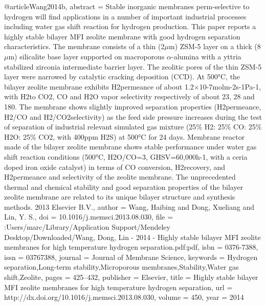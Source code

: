 @article{Wang2014b,
abstract = {Stable inorganic membranes perm-selective to hydrogen will find applications in a number of important industrial processes including water gas shift reaction for hydrogen production. This paper reports a highly stable bilayer MFI zeolite membrane with good hydrogen separation characteristics. The membrane consists of a thin (2$\mu$m) ZSM-5 layer on a thick (8$\mu$m) silicalite base layer supported on macroporous $\alpha$-alumina with a yttria stabilized zirconia intermediate barrier layer. The zeolitic pores of the thin ZSM-5 layer were narrowed by catalytic cracking deposition (CCD). At 500°C, the bilayer zeolite membrane exhibits H2permeance of about 1.2×10-7molm-2s-1Pa-1, with H2to CO2, CO and H2O vapor selectivity respectively of about 23, 28 and 180. The membrane shows slightly improved separation properties (H2permeance, H2/CO and H2/CO2selectivity) as the feed side pressure increases during the test of separation of industrial relevant simulated gas mixture (25{\%} H2: 25{\%} CO: 25{\%} H2O: 25{\%} CO2, with 400ppm H2S) at 500°C for 24 days. Membrane reactor made of the bilayer zeolite membrane shows stable performance under water gas shift reaction conditions (500°C, H2O/CO=3, GHSV=60,000h-1, with a ceria doped iron oxide catalyst) in terms of CO conversion, H2recovery, and H2permeance and selectivity of the zeolite membrane. The unprecedented thermal and chemical stability and good separation properties of the bilayer zeolite membrane are related to its unique bilayer structure and synthesis methods. {\textcopyright} 2013 Elsevier B.V.},
author = {Wang, Haibing and Dong, Xueliang and Lin, Y. S.},
doi = {10.1016/j.memsci.2013.08.030},
file = {:Users/marc/Library/Application Support/Mendeley Desktop/Downloaded/Wang, Dong, Lin - 2014 - Highly stable bilayer MFI zeolite membranes for high temperature hydrogen separation.pdf:pdf},
isbn = {0376-7388},
issn = {03767388},
journal = {Journal of Membrane Science},
keywords = {Hydrogen separation,Long-term stability,Microporous membranes,Stability,Water gas shift,Zeolite},
pages = {425--432},
publisher = {Elsevier},
title = {{Highly stable bilayer MFI zeolite membranes for high temperature hydrogen separation}},
url = {http://dx.doi.org/10.1016/j.memsci.2013.08.030},
volume = {450},
year = {2014}
}
